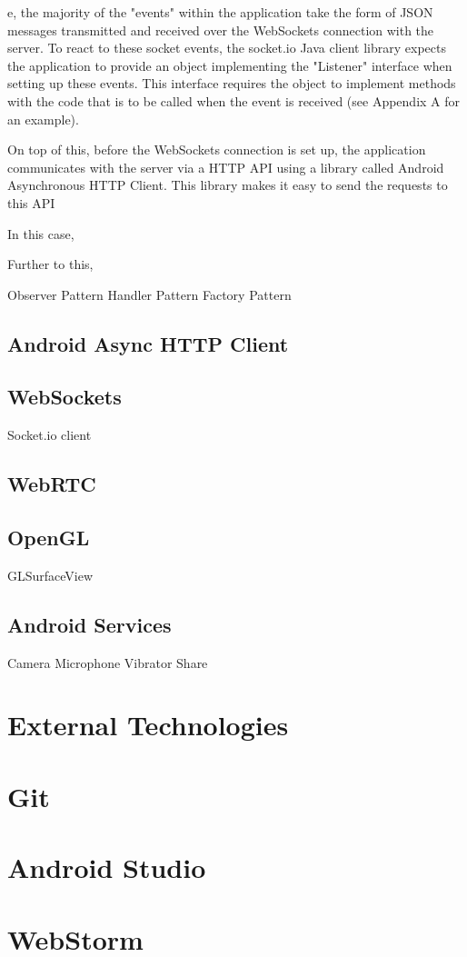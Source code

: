 \documentclass[]{report}
\begin{document}
			e, the majority of the "events" within the application take the form of JSON messages transmitted and received over the WebSockets connection with the server. To react to these socket events, the socket.io Java client library expects the application to provide an object implementing the "Listener" interface when setting up these events. This interface requires the object to implement methods with the code that is to be called when the event is received (see Appendix A for an example).
			
			On top of this, before the WebSockets connection is set up, the application communicates with the server via a HTTP API using a library called Android Asynchronous HTTP Client. This library makes it easy to send the requests to this API 
						
			In this case, 

 			Further to this, 
			

		Observer Pattern
		Handler Pattern
		Factory Pattern
		\subsection{Android Async HTTP Client}
		\subsection{WebSockets}
		Socket.io client
		\subsection{WebRTC}
		\subsection{OpenGL}
		GLSurfaceView
		\subsection{Android Services}
		Camera
		Microphone
		Vibrator
		Share
	\section{External Technologies}
		\section{Git}
		\section{Android Studio}
		\section{WebStorm}
		
\end{document}
